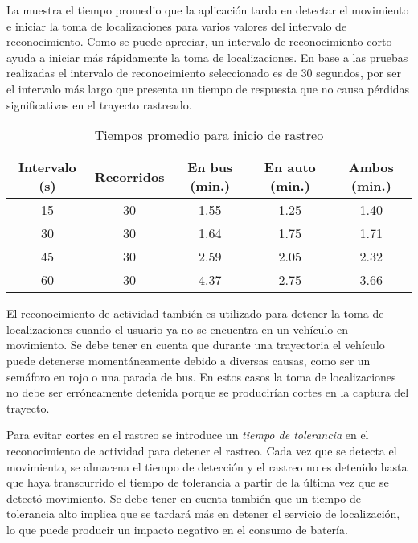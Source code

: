 La  muestra el tiempo promedio que la aplicación tarda en detectar el movimiento e iniciar la toma de localizaciones para varios valores del intervalo de reconocimiento. Como se puede apreciar, un intervalo de reconocimiento corto ayuda a iniciar más rápidamente la toma de localizaciones. En base a las pruebas realizadas el intervalo de reconocimiento seleccionado es de 30 segundos, por ser el intervalo más largo que presenta un tiempo de respuesta que no causa pérdidas significativas en el trayecto rastreado.


\begin{table}[h]
  \centering
	\begin{tabular}{ccccc}
	\toprule
	Intervalo (s) & Recorridos & En bus (min.) & En auto (min.) & Ambos (min.) \\
	\midrule
	15            & 30       & 1.55         & 1.25            & 1.40         \\
	30            & 30       & 1.64         & 1.75            & 1.71         \\
	45            & 30       & 2.59         & 2.05            & 2.32         \\
	60            & 30       & 4.37         & 2.75            & 3.66         \\
	\bottomrule
	\end{tabular}
  \caption{Tiempos promedio para inicio de rastreo}
  \label{tab:prom_intervalo_reconocimiento}
\end{table}


El reconocimiento de actividad también es utilizado para detener la toma de localizaciones cuando el usuario ya no se encuentra en un vehículo en movimiento. Se debe tener en cuenta que durante una trayectoria el vehículo puede detenerse momentáneamente debido a diversas causas, como ser un semáforo en rojo o una parada de bus. En estos casos la toma de localizaciones no debe ser erróneamente detenida porque se producirían cortes en la captura del trayecto. 

Para evitar cortes en el rastreo se introduce un \emph{tiempo de tolerancia} en el reconocimiento de actividad para detener el rastreo. Cada vez que se detecta el movimiento, se almacena el tiempo de detección y el rastreo no es detenido hasta que haya transcurrido el tiempo de tolerancia a partir de la última vez que se detectó movimiento. Se debe tener en cuenta también que un tiempo de tolerancia alto implica que se tardará más en detener el servicio de localización, lo que puede producir un impacto negativo en el consumo de batería.

